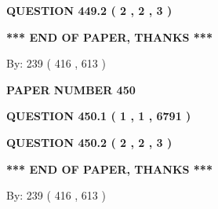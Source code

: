 \documentclass[12pt]{article}
\begin{document}
{\textbf{\Large{QUESTION
449.2 
 ( 2 , 2 , 3 )
}}}
  
  
   
   
 \vspace{0.2in}
 
   
   
   
   
\vspace{1.0in} 
{\textbf{\large{ *** END OF PAPER, THANKS *** }}} 
   
   
\hspace{1.0in} By: 
 239 ( 416 ,  613 )
   
   
   
   
\newpage 
\setcounter{page}{ 
   450001 } 
   
   
   
   
 {\textbf{ \Large{ PAPER NUMBER  450  }}}
   
   
\vspace{0.2in}
   
   
   
   
   
   
 \vspace{0.2in}
 
 
 
 
   
   
  
\vspace{0.2in}
  
{\textbf{\Large{QUESTION
450.1 
 ( 1 , 1 , 6791 )
}}}
  
  
  
\vspace{0.2in}
  
{\textbf{\Large{QUESTION
450.2 
 ( 2 , 2 , 3 )
}}}
  
  
   
   
 \vspace{0.2in}
 
   
   
   
   
\vspace{1.0in} 
{\textbf{\large{ *** END OF PAPER, THANKS *** }}} 
   
   
\hspace{1.0in} By: 
 239 ( 416 ,  613 )
   
   
   
   
\newpage 
\setcounter{page}{ 
   451001 } 
   
   
   
\end{document}
